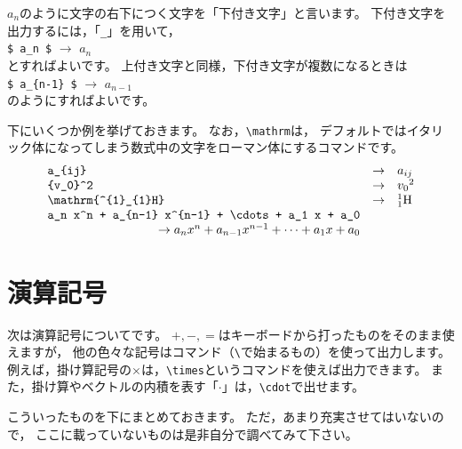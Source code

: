 \documentclass[class=jreport, crop=false, preview=false, dvipdfmx, fleqn]{standalone}
\begin{document}
$a_n$のように文字の右下につく文字を「下付き文字」と言います。
下付き文字を出力するには，「\verb|_|」を用いて，\\
\hspace{5zw} \verb|$ a_n $| $\rightarrow$ $a_n$ \\
とすればよいです。
上付き文字と同様，下付き文字が複数になるときは \\
\hspace{5zw} \verb|$ a_{n-1} $| $\rightarrow$ $a_{n-1}$ \\
のようにすればよいです。

下にいくつか例を挙げておきます。
なお，\verb|\mathrm|は，
デフォルトではイタリック体になってしまう数式中の文字をローマン体にするコマンドです。
\[ \begin{array}{lcl}
\verb|a_{ij}| & \rightarrow & a_{ij} \\
\verb|{v_0}^2| & \rightarrow & {v_0}^2 \\
\verb|\mathrm{^{1}_{1}H}| & \rightarrow & \mathrm{^{1}_{1}H} \\
\verb|a_n x^n + a_{n-1} x^{n-1} + \cdots + a_1 x + a_0| & & \\
\hfill \rightarrow a_n x^n + a_{n-1} x^{n-1} + \cdots + a_1 x + a_0 \\
\end{array} \]



\section{演算記号}
次は演算記号についてです。
$+, -, =$はキーボードから打ったものをそのまま使えますが，
他の色々な記号はコマンド（\verb|\|で始まるもの）を使って出力します。
例えば，掛け算記号の$\times$は，\verb|\times|というコマンドを使えば出力できます。
また，掛け算やベクトルの内積を表す「$\cdot$」は，\verb|\cdot|で出せます。

こういったものを下にまとめておきます。
ただ，あまり充実させてはいないので，
ここに載っていないものは是非自分で調べてみて下さい。
\end{document}
